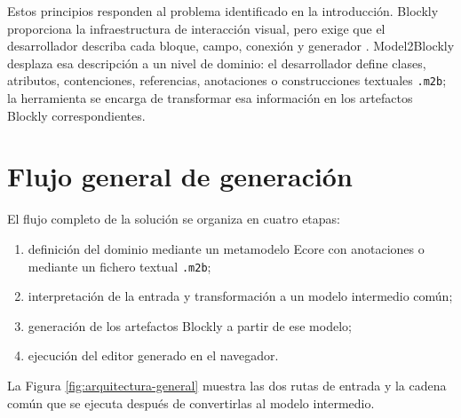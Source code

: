 Estos principios responden al problema identificado en la introducción. Blockly
proporciona la infraestructura de interacción visual, pero exige que el
desarrollador describa cada bloque, campo, conexión y generador
\cite{blocklyDocs}. Model2Blockly desplaza esa descripción a un nivel de dominio:
el desarrollador define clases, atributos, contenciones, referencias,
anotaciones o construcciones textuales \texttt{.m2b}; la herramienta se encarga
de transformar esa información en los artefactos Blockly correspondientes.

\section{Flujo general de generación}
\label{sec:flujo-generacion}

El flujo completo de la solución se organiza en cuatro etapas:

\begin{enumerate}
  \item definición del dominio mediante un metamodelo Ecore con anotaciones o
  mediante un fichero textual \texttt{.m2b};
  \item interpretación de la entrada y transformación a un modelo intermedio
  común;
  \item generación de los artefactos Blockly a partir de ese modelo;
  \item ejecución del editor generado en el navegador.
\end{enumerate}

La Figura \ref{fig:arquitectura-general} muestra las dos rutas de entrada y la
cadena común que se ejecuta después de convertirlas al modelo intermedio.

